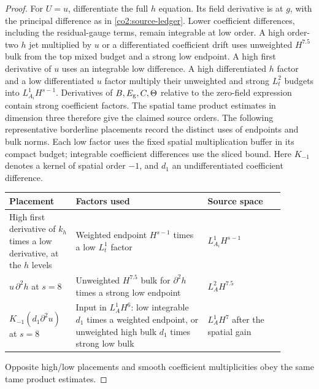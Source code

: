\begin{proof}
For $U=u$, differentiate the full $h$ equation.  Its field derivative is
at $g$, with the principal difference as in \eqref{co2:source-ledger}.
Lower coefficient differences, including the residual-gauge terms, remain
integrable at low order.  A high order-two $h$ jet multiplied by $u$ or a
differentiated coefficient drift uses unweighted $H^{7.5}$ bulk from the top
mixed budget and a strong low endpoint.  A high first derivative of $u$
uses an integrable low difference.  A high differentiated $h$ factor and a
low differentiated $u$ factor multiply their unweighted and strong $L^2_t$
budgets into $L^1_{A_i}H^{s-1}$.  Derivatives of $B,E_{\rm g},C,\Theta$
relative to the zero-field expression contain strong coefficient factors.
The spatial tame product estimates in dimension three therefore give the
claimed source orders.  The following representative borderline placements
record the distinct uses of endpoints and bulk norms.  Each low factor uses
the fixed spatial multiplication buffer in its compact budget; integrable
coefficient differences use the sliced bound.
Here $K_{-1}$ denotes a kernel of spatial order $-1$, and $d_1$ an
undifferentiated coefficient difference.
\begin{center}
\small
\begin{tabular}{@{}p{0.21\linewidth}p{0.43\linewidth}p{0.25\linewidth}@{}}
\toprule
Placement & Factors used & Source space \\
\midrule
High first derivative of $k_h$ times a low derivative, at the $h$ levels
& Weighted endpoint $H^{s-1}$ times a low $L^1_t$ factor
& $L^1_{A_i}H^{s-1}$ \\[3pt]
$u\,\partial^2h$ at $s=8$
& Unweighted $H^{7.5}$ bulk for $\partial^2h$ times a strong low endpoint
& $L^2_AH^{7.5}$ \\[3pt]
$K_{-1}(d_1\partial^2u)$ at $s=8$
& Input in $L^1_AH^6$: low integrable $d_1$ times a weighted endpoint,
  or unweighted high bulk $d_1$ times strong low bulk
& $L^1_AH^7$ after the spatial gain \\
\bottomrule
\end{tabular}
\end{center}
Opposite high/low placements and smooth coefficient multiplicities obey the same tame product estimates.


\end{proof}
